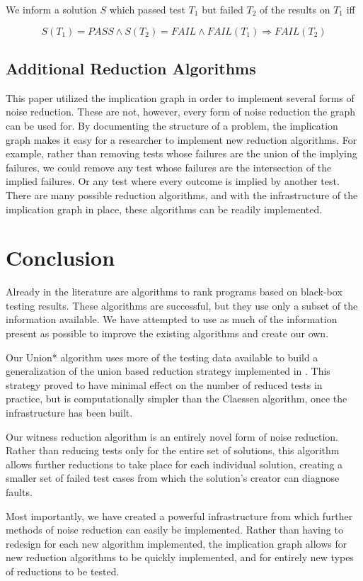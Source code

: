 \documentclass[11pt,twoside]{article}
\newcommand\fail{\mathit{FAIL}}
\theoremstyle{definition}
\let\cite=\citep
\begin{document}
\centerline{We inform a solution $S$ which passed test $T_1$ but failed $T_2$ of the results on  $T_1$ iff}
$$ S(T_1) = PASS \wedge S(T_2) = \fail \wedge \fail(T_1) \Rightarrow \fail(T_2)$$

\subsection{Additional Reduction Algorithms}


This paper utilized the implication graph in order to implement several forms of noise reduction. These are not, however, every form of noise reduction the graph can be used for. By documenting the structure of a problem, the implication graph makes it easy for a researcher to implement new reduction algorithms. For example, rather than removing tests whose failures are the union of the implying failures, we could remove any test whose failures are the intersection of the implied failures. Or any test where every outcome is implied by another test. There are many possible reduction algorithms, and with the infrastructure of the implication graph in place, these algorithms can be readily implemented.

\section{Conclusion}
Already in the literature are algorithms to rank programs based on black-box testing results. These algorithms are successful, but they use only a subset of the information available. We have attempted to use as much of the information present as possible to improve the existing algorithms and create our own.

Our Union* algorithm uses more of the testing data available to build a generalization of the union based reduction strategy implemented in \cite{Claessen}. This strategy proved to have minimal effect on the number of reduced tests in practice, but is computationally simpler than the Claessen algorithm, once the infrastructure has been built.

Our witness reduction algorithm is an entirely novel form of noise reduction. Rather than reducing tests only for the entire set of solutions, this algorithm allows further reductions to take place for each individual solution, creating a smaller set of failed test cases from which the solution's creator can diagnose faults.

Most importantly, we have created a powerful infrastructure from which further methods of noise reduction can easily be implemented. Rather than having to redesign for each new algorithm implemented, the implication graph allows for new reduction algorithms to be quickly implemented, and for entirely new types of reductions to be tested.



\end{document}
